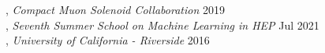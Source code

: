 , \textit{Compact Muon Solenoid Collaboration} \hfill 2019 \\
, \textit{Seventh Summer School on Machine Learning in HEP} \hfill Jul 2021 \\
, \textit{University of California - Riverside} \hfill 2016 \\